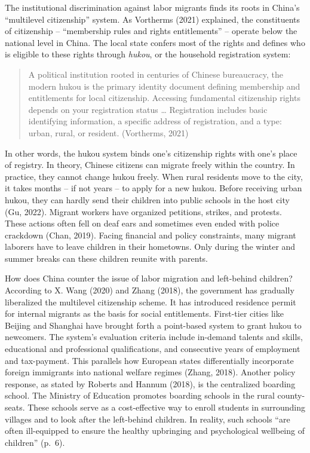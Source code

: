 \documentclass[
  man,floatsintext]{apa7}
\begin{document}
The institutional discrimination against labor migrants finds its roots in China's ``multilevel citizenship'' system. As Vortherms (2021) explained, the constituents of citizenship -- ``membership rules and rights entitlements'' -- operate below the national level in China. The local state confers most of the rights and defines who is eligible to these rights through \emph{hukou}, or the household registration system:

\begin{quote}
A political institution rooted in centuries of Chinese bureaucracy, the modern hukou is the primary identity document defining membership and entitlements for local citizenship. Accessing fundamental citizenship rights depends on your registration status \ldots{} Registration includes basic identifying information, a specific address of registration, and a type: urban, rural, or resident. (Vortherms, 2021)
\end{quote}

In other words, the hukou system binds one's citizenship rights with one's place of registry. In theory, Chinese citizens can migrate freely within the country. In practice, they cannot change hukou freely. When rural residents move to the city, it takes months -- if not years -- to apply for a new hukou. Before receiving urban hukou, they can hardly send their children into public schools in the host city (Gu, 2022). Migrant workers have organized petitions, strikes, and protests. These actions often fell on deaf ears and sometimes even ended with police crackdown (Chan, 2019). Facing financial and policy constraints, many migrant laborers have to leave children in their hometowns. Only during the winter and summer breaks can these children reunite with parents.

How does China counter the issue of labor migration and left-behind children? According to X. Wang (2020) and Zhang (2018), the government has gradually liberalized the multilevel citizenship scheme. It has introduced residence permit for internal migrants as the basis for social entitlements. First-tier cities like Beijing and Shanghai have brought forth a point-based system to grant hukou to newcomers. The system's evaluation criteria include in-demand talents and skills, educational and professional qualifications, and consecutive years of employment and tax-payment. This parallels how European states differentially incorporate foreign immigrants into national welfare regimes (Zhang, 2018). Another policy response, as stated by Roberts and Hannum (2018), is the centralized boarding school. The Ministry of Education promotes boarding schools in the rural county-seats. These schools serve as a cost-effective way to enroll students in surrounding villages and to look after the left-behind children. In reality, such schools ``are often ill-equipped to ensure the healthy upbringing and psychological wellbeing of children'' (p.~6).
\end{document}
